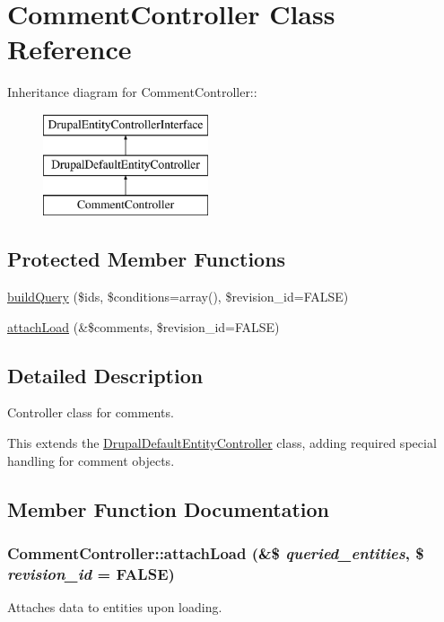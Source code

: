 \hypertarget{classCommentController}{
\section{CommentController Class Reference}
\label{classCommentController}
}
Inheritance diagram for CommentController::\begin{figure}[H]
\begin{center}
\leavevmode
\includegraphics[height=3cm]{classCommentController}
\end{center}
\end{figure}
\subsection*{Protected Member Functions}
\begin{DoxyCompactItemize}
\item 
\hyperlink{classCommentController_a0feb93a67f87f04b06eb64eb0d359ca7}{buildQuery} (\$ids, \$conditions=array(), \$revision\_\-id=FALSE)
\item 
\hyperlink{classCommentController_a0a9904b695922b40ac18b5cfeb6a5b9a}{attachLoad} (\&\$comments, \$revision\_\-id=FALSE)
\end{DoxyCompactItemize}


\subsection{Detailed Description}
Controller class for comments.

This extends the \hyperlink{classDrupalDefaultEntityController}{DrupalDefaultEntityController} class, adding required special handling for comment objects. 

\subsection{Member Function Documentation}
\hypertarget{classCommentController_a0a9904b695922b40ac18b5cfeb6a5b9a}{
\subsubsection[{attachLoad}]{\setlength{\rightskip}{0pt plus 5cm}CommentController::attachLoad (\&\$ {\em queried\_\-entities}, \/  \$ {\em revision\_\-id} = {\ttfamily FALSE})}}
\label{classCommentController_a0a9904b695922b40ac18b5cfeb6a5b9a}
Attaches data to entities upon loading.

